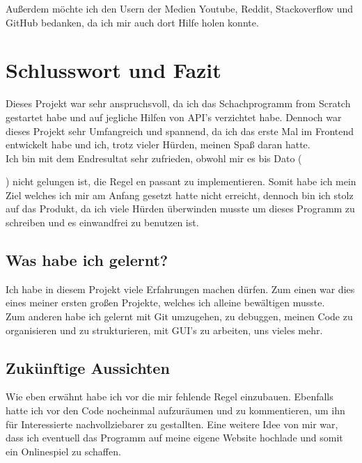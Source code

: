 \documentclass[a4paper, 10pt]{scrartcl}
\begin{document}
Außerdem möchte ich den Usern der Medien Youtube, Reddit, Stackoverflow und GitHub bedanken,
da ich mir auch dort Hilfe holen konnte. 

\section{Schlusswort und Fazit}
Dieses Projekt war sehr anspruchsvoll, da ich das Schachprogramm \glqq from Scratch\grqq{}
gestartet habe und auf jegliche Hilfen von API's verzichtet habe. Dennoch war dieses Projekt
sehr Umfangreich und spannend, da ich das erste Mal im Frontend entwickelt habe und ich,
trotz vieler Hürden, meinen Spaß daran hatte. \\
Ich bin mit dem Endresultat sehr zufrieden, obwohl mir es bis Dato (\date{}) 
nicht gelungen ist, die Regel \glqq en passant \grqq{} zu implementieren.
Somit habe ich mein Ziel welches ich mir am Anfang gesetzt hatte nicht
erreicht, dennoch bin ich stolz auf das Produkt, da ich viele Hürden überwinden musste um
dieses Programm zu schreiben und es einwandfrei zu benutzen ist. 

\subsection{Was habe ich gelernt?}
Ich habe in diesem Projekt viele Erfahrungen machen dürfen.
Zum einen war dies eines meiner ersten großen Projekte, welches
ich alleine bewältigen musste.\\
Zum anderen habe ich gelernt mit Git umzugehen, zu debuggen,
meinen Code zu organisieren und zu strukturieren, mit GUI's zu arbeiten,
uns vieles mehr.


\subsection{Zukünftige Aussichten}
Wie eben erwähnt habe ich vor die mir fehlende Regel einzubauen. Ebenfalls hatte ich vor
den Code nocheinmal aufzuräumen und zu kommentieren, um ihn für Interessierte nachvollziebarer
zu gestallten. 
Eine weitere Idee von mir war, dass ich eventuell das Programm auf meine eigene Website
hochlade und somit ein Onlinespiel zu schaffen.
\end{document}
